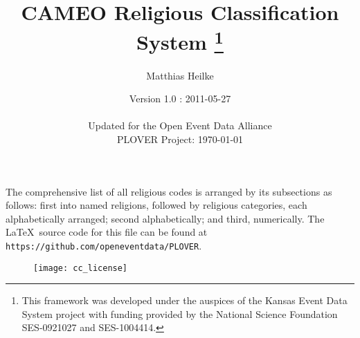\documentclass[12pt]{article}
\title{CAMEO Religious Classification System
\thanks{ This framework was developed under the auspices of the Kansas Event Data System project with funding provided by the National Science Foundation SES-0921027 and SES-1004414.}}
\author{Matthias Heilke  }
\date{Version 1.0 : 2011-05-27 \\~\\Updated for the Open Event Data Alliance\\ PLOVER Project: \today}
\begin{document}
\maketitle

\newpage


The comprehensive list of all religious codes is arranged by its subsections as follows: first into named religions, followed by religious categories, each alphabetically arranged; second alphabetically; and third, numerically.  The \LaTeX ~source code for this file can be found at \texttt{https://github.com/openeventdata/PLOVER}.

\begin{figure}[h!]
\centering
\texttt{[image: cc\_license]}
\end{figure}
\end{document}
